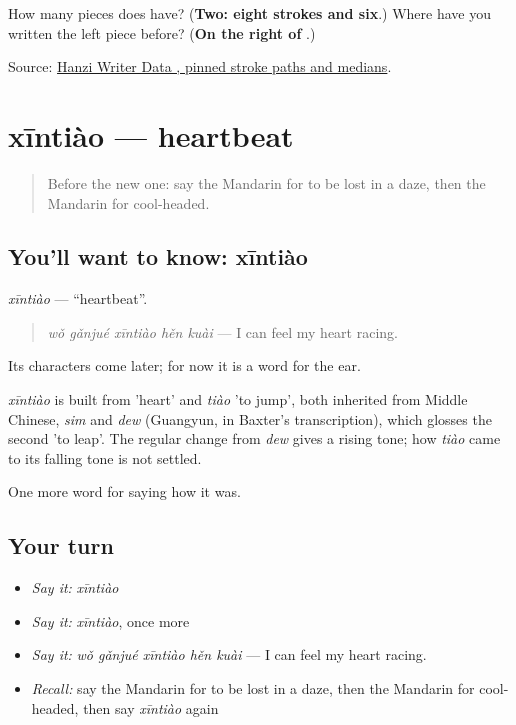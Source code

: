 \begin{tcolorbox}[breakable,colback=teal!4,colframe=teal!35!black,title={Before you move on}]
How many pieces does  have? (\textbf{Two: eight strokes and six}.) Where have you written the left piece before? (\textbf{On the right of }.)

Source: \href{https://raw.githubusercontent.com/chanind/hanzi-writer-data/68d10a4b21150cae5e1ebbd223eed289cf32d90c/data/\%E9\%9D\%99.json}{Hanzi Writer Data , pinned stroke paths and medians}.
\end{tcolorbox}
\section[xīntiào]{xīntiào — heartbeat}

\label{lesson:ZH-C466-xintiao}



\begin{quote}
Before the new one: say the Mandarin for to be lost in a daze, then the Mandarin for cool-headed.
\end{quote}

\subsection*{You'll want to know: xīntiào}
\emph{xīntiào} — \textquotedblleft{}heartbeat\textquotedblright{}.

\begin{quote}
\emph{wǒ gǎnjué xīntiào hěn kuài} — I can feel my heart racing.
\end{quote}

Its characters come later; for now it is a word for the ear.

\begin{cousinweb}
\emph{xīntiào} is built from  'heart' and \emph{tiào} 'to jump', both inherited from Middle Chinese, \emph{sim} and \emph{dew} (Guangyun, in Baxter's transcription), which glosses the second 'to leap'. The regular change from \emph{dew} gives a rising tone; how \emph{tiào} came to its falling tone is not settled.
\end{cousinweb}

\begin{grammarlens}[title={What you've built}]
One more word for saying how it was.
\end{grammarlens}

\subsection*{Your turn}
\begin{itemize}
\raggedright
  \item \emph{Say it:} \emph{xīntiào}
  \item \emph{Say it:} \emph{xīntiào}, once more
  \item \emph{Say it:} \emph{wǒ gǎnjué xīntiào hěn kuài} — I can feel my heart racing.
  \item \emph{Recall:} say the Mandarin for to be lost in a daze, then the Mandarin for cool-headed, then say \emph{xīntiào} again
\end{itemize}

